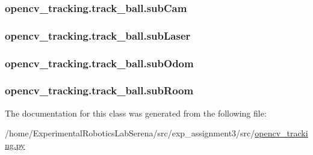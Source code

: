 \subsubsection[{\texorpdfstring{sub\+Cam}{subCam}}]{\setlength{\rightskip}{0pt plus 5cm}opencv\+\_\+tracking.\+track\+\_\+ball.\+sub\+Cam}\hypertarget{classopencv__tracking_1_1track__ball_a6a59156565d2de7078b22a42f78bea15}{}\label{classopencv__tracking_1_1track__ball_a6a59156565d2de7078b22a42f78bea15}
\subsubsection[{\texorpdfstring{sub\+Laser}{subLaser}}]{\setlength{\rightskip}{0pt plus 5cm}opencv\+\_\+tracking.\+track\+\_\+ball.\+sub\+Laser}\hypertarget{classopencv__tracking_1_1track__ball_a507d8922c32816d11bc19fadde9ab86c}{}\label{classopencv__tracking_1_1track__ball_a507d8922c32816d11bc19fadde9ab86c}
\subsubsection[{\texorpdfstring{sub\+Odom}{subOdom}}]{\setlength{\rightskip}{0pt plus 5cm}opencv\+\_\+tracking.\+track\+\_\+ball.\+sub\+Odom}\hypertarget{classopencv__tracking_1_1track__ball_a4919ca741e094d9679e31c44c58a5295}{}\label{classopencv__tracking_1_1track__ball_a4919ca741e094d9679e31c44c58a5295}
\subsubsection[{\texorpdfstring{sub\+Room}{subRoom}}]{\setlength{\rightskip}{0pt plus 5cm}opencv\+\_\+tracking.\+track\+\_\+ball.\+sub\+Room}\hypertarget{classopencv__tracking_1_1track__ball_af74c14d19610c2dccedfe19b76680fa6}{}\label{classopencv__tracking_1_1track__ball_af74c14d19610c2dccedfe19b76680fa6}


The documentation for this class was generated from the following file\+:\begin{DoxyCompactItemize}
\item 
/home/\+Experimental\+Robotics\+Lab\+Serena/src/exp\+\_\+assignment3/src/\hyperlink{opencv__tracking_8py}{opencv\+\_\+tracking.\+py}\end{DoxyCompactItemize}
